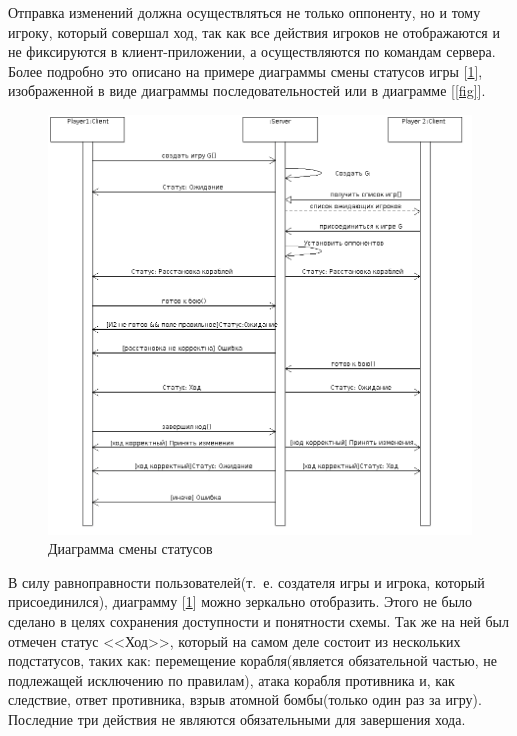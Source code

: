  Отправка изменений должна осуществляться не только оппоненту, но и тому игроку, который совершал ход, так как все действия игроков не отображаются и не фиксируются в клиент-приложении, а осуществляются по командам сервера. Более подробно это описано на примере диаграммы смены статусов игры [\ref{fig17}], изображенной в виде диаграммы последовательностей или в диаграмме [\ref{fig}].

\begin{figure}[htp]
\centering
\includegraphics[width=18cm]{images/srvstate.png}
\caption{Диаграмма смены статусов}
\label{fig17}
\end{figure}

В силу равноправности пользователей(т.~е. создателя игры и игрока, который присоединился), диаграмму [\ref{fig17}] можно зеркально отобразить. Этого не было сделано в целях сохранения доступности и понятности схемы. Так же на ней был отмечен статус <<Ход>>, который на самом деле состоит из нескольких подстатусов, таких как: перемещение корабля(является обязательной частью, не подлежащей исключению по правилам), атака корабля противника и, как следствие, ответ противника, взрыв атомной бомбы(только один раз за игру). Последние три действия не являются обязательными для завершения хода. 

